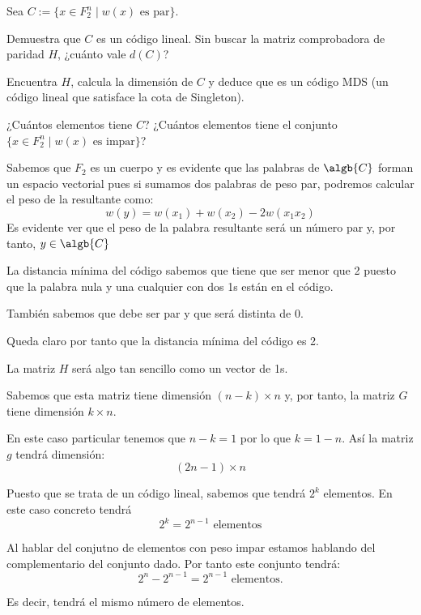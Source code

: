 \begin{problem}[14]
Sea $  C:=\{x\in F_2^n \mid w(x) \text{ es par}\}$.

\ppart  Demuestra que $  C$ es un código lineal. Sin buscar la matriz
comprobadora de paridad $H$, ¿cuánto vale $d( C)$?

\ppart Encuentra $H$, calcula la dimensión de $C$ y deduce que es un
código MDS (un código lineal que satisface la cota de Singleton).

\ppart ¿Cuántos elementos tiene $C$? ¿Cuántos elementos tiene el
conjunto $\{x\in F_2^n \mid w(x) \text{ es impar}\}$?
\solution



\spart

Sabemos que $F_2$ es un cuerpo y es evidente que las palabras de $\algb{C}$ forman un espacio vectorial pues si sumamos dos palabras de peso par, podremos calcular el peso de la resultante como:
\[w(y)=w(x_1)+w(x_2) - 2w(x_1x_2)\]
Es evidente ver que el peso de la palabra resultante será un número par y, por tanto, $y \in \algb{C}$

La distancia mínima del código sabemos que tiene que ser menor que 2 puesto que la palabra nula y una cualquier con dos 1s están en el código.

También sabemos que debe ser par y que será distinta de 0.

Queda claro por tanto que la distancia mínima del código es 2.

\spart

La matriz $H$ será algo tan sencillo como un vector de 1s.

Sabemos que esta matriz tiene dimensión $(n-k)\times n$ y, por tanto, la matriz $G$ tiene dimensión $k \times n$.

En este caso particular tenemos que $n-k=1$ por lo que $k=1-n$. Así la matriz $g$ tendrá dimensión:
\[(2n-1) \times n\]

\spart

Puesto que se trata de un código lineal, sabemos que tendrá $2^k$ elementos. En este caso concreto tendrá
\[2^k = 2^{n-1} \text{ elementos}\]

Al hablar del conjutno de elementos con peso impar estamos hablando del complementario del conjunto dado. Por tanto este conjunto tendrá:
\[2^n-2^{n-1} = 2^{n-1}\text{ elementos.}\]

Es decir, tendrá el mismo número de elementos.

\end{problem}

